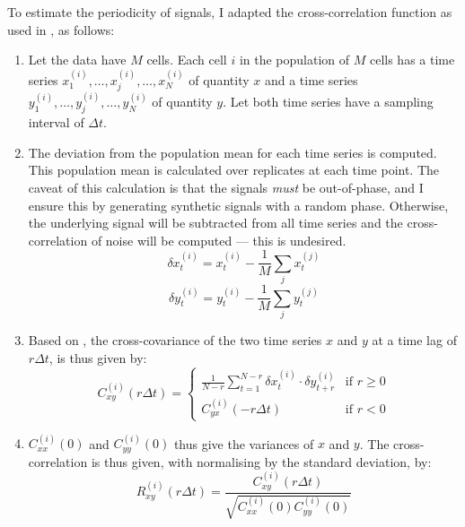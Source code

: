 To estimate the periodicity of signals, I adapted the cross-correlation function as used in \textcite{pietschDeterminingGrowthRates2023}, as follows:

\begin{enumerate}
  \item Let the data have $M$ cells.
        Each cell $i$ in the population of $M$ cells has a time series $x_{1}^{(i)}, \ldots , x_{j}^{(i)}, \ldots , x_{N}^{(i)}$ of quantity $x$ and a time series $y_{1}^{(i)}, \ldots , y_{j}^{(i)}, \ldots , y_{N}^{(i)}$ of quantity $y$.
        Let both time series have a sampling interval of $\Delta t$.
  \item The deviation from the population mean for each time series is computed.
        This population mean is calculated over replicates at each time point.
        The caveat of this calculation is that the signals \emph{must} be out-of-phase, and I ensure this by generating synthetic signals with a random phase.
        Otherwise, the underlying signal will be subtracted from all time series and the cross-correlation of noise will be computed --- this is undesired.
        \begin{equation}
          \delta x_{t}^{(i)} = x_{t}^{(i)} - \frac{1}{M} \sum_{j}x_{t}^{(j)}
          \label{eq:xcf-dmeans-x}
        \end{equation}
        \begin{equation}
          \delta y_{t}^{(i)} = y_{t}^{(i)} - \frac{1}{M} \sum_{j}y_{t}^{(j)}
          \label{eq:xcf-dmeans-y}
        \end{equation}
  \item Based on \textcite{kivietStochasticityMetabolismGrowth2014}, the cross-covariance of the two time series $x$ and $y$ at a time lag of $r\Delta t$, is thus given by:
        \begin{equation}
          C_{xy}^{(i)}(r\Delta t) =
          \begin{cases}
            \frac{1}{N-r} \sum_{t=1}^{N-r} \delta x_{t}^{(i)} \cdot \delta y_{t+r}^{(i)} & \text{if } r \geq 0 \\
            C_{yx}^{(i)}(-r \Delta t) & \text{if } r < 0
          \end{cases}
          \label{eq:xcf-xcov}
        \end{equation}
    \item $C_{xx}^{(i)}(0)$ and $C_{yy}^{(i)}(0)$ thus give the variances of $x$ and $y$.  The cross-correlation is thus given, with normalising by the standard deviation, by:
        \begin{equation}
          R_{xy}^{(i)}(r \Delta t) = \frac{C_{xy}^{(i)}(r \Delta t)}{\sqrt{C_{xx}^{(i)}(0) C_{yy}^{(i)}(0)}}
          \label{eq:xcf-xcf}
        \end{equation}
\end{enumerate}

